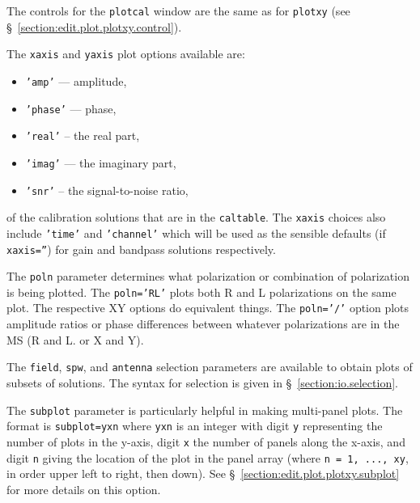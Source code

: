 {The controls for the {\tt plotcal} window are the same as for
{\tt plotxy} (see \S~\ref{section:edit.plot.plotxy.control}).

The {\tt xaxis} and {\tt yaxis} plot options available are:
\begin{itemize}
   \item {\tt 'amp'} --- amplitude,
   \item {\tt 'phase'} --- phase,
   \item {\tt 'real'} -- the real part,
   \item {\tt 'imag'} --- the imaginary part,
   \item {\tt 'snr'} -- the signal-to-noise ratio,
\end{itemize}
of the calibration solutions that are in the {\tt caltable}.
The {\tt xaxis} choices also include {\tt 'time'} and {\tt 'channel'}
which will be used as the sensible defaults (if {\tt xaxis=''}) for
gain and bandpass solutions respectively.

The {\tt poln} parameter determines what polarization or combination of
polarization is being plotted.  The {\tt poln='RL'} plots both
R and L polarizations on the same plot.  The respective XY options do
equivalent things.  The {\tt poln='/'} option
plots amplitude ratios or phase differences between whatever
polarizations are in the MS (R and L. or X and Y).  

The {\tt field}, {\tt spw}, and {\tt antenna} selection parameters are
available to obtain plots of subsets of solutions.  The syntax for 
selection is given in \S~\ref{section:io.selection}.

The {\tt subplot} parameter is particularly helpful in making 
multi-panel plots.  The format is  
{\tt subplot=yxn} where {\tt yxn} is an integer with digit
{\tt y} representing the number of plots in the y-axis, digit
{\tt x} the number of panels along the x-axis, and digit {\tt n}
giving the location of the plot in the panel array (where
{\tt n = 1, ..., xy}, in order upper left to right, then down).
See \S~\ref{section:edit.plot.plotxy.subplot} for more details on this
option.

}
